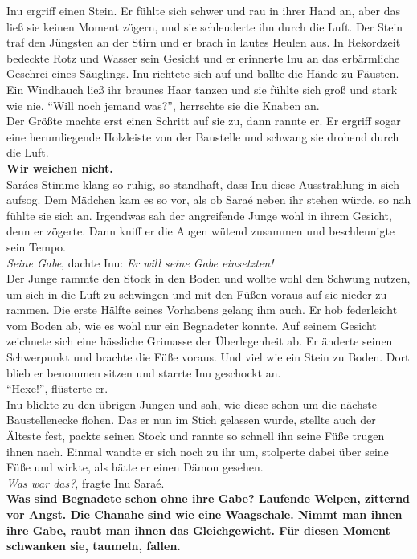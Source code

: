 \documentclass[a4paper,12pt]{book}
\begin{document}
Inu ergriff einen Stein. Er fühlte sich schwer und rau in ihrer Hand an, aber das ließ sie keinen 
Moment zögern, und sie schleuderte ihn durch die Luft. Der Stein traf den Jüngsten an der Stirn und 
er brach in lautes Heulen aus. In Rekordzeit bedeckte Rotz und Wasser sein Gesicht und er erinnerte 
Inu an das erbärmliche Geschrei eines Säuglings. Inu richtete sich auf und ballte die Hände zu 
Fäusten. Ein Windhauch ließ ihr braunes Haar tanzen und sie fühlte sich groß und stark wie nie.
``Will noch jemand was?'', herrschte sie die Knaben an. \\
Der Größte machte erst einen Schritt auf sie zu, dann rannte er. Er ergriff sogar eine herumliegende 
Holzleiste von der Baustelle und schwang sie drohend durch die Luft.\\
\textbf{Wir weichen nicht.}\\
Saráes Stimme klang so ruhig, so standhaft, dass Inu diese Ausstrahlung in sich aufsog. Dem Mädchen 
kam es so vor, als ob Saraé neben ihr stehen würde, so nah fühlte sie sich an. Irgendwas sah der 
angreifende Junge wohl in ihrem Gesicht, denn er zögerte. Dann kniff er die Augen wütend zusammen 
und beschleunigte sein Tempo.\\
\textit{Seine Gabe}, dachte Inu: \textit{Er will seine Gabe einsetzten!}\\
Der Junge rammte den Stock in den Boden und wollte wohl den Schwung nutzen, um sich in die Luft zu 
schwingen und mit den Füßen voraus auf sie nieder zu rammen. Die erste Hälfte seines Vorhabens 
gelang ihm auch. Er hob federleicht vom Boden ab, wie es wohl nur ein Begnadeter konnte. Auf seinem 
Gesicht zeichnete sich eine hässliche Grimasse der Überlegenheit ab. Er änderte seinen Schwerpunkt 
und brachte die Füße voraus. Und viel wie ein Stein zu Boden. Dort blieb er benommen sitzen und 
starrte Inu geschockt an. \\
``Hexe!'', flüsterte er. \\
Inu blickte zu den übrigen Jungen und sah, wie diese schon um die nächste Baustellenecke flohen. 
Das er nun im Stich gelassen wurde, stellte auch der Älteste fest, packte seinen Stock und rannte 
so schnell ihn seine Füße trugen ihnen nach. Einmal wandte er sich noch zu ihr um, stolperte dabei 
über seine Füße und wirkte, als hätte er einen Dämon gesehen. \\
\textit{Was war das?}, fragte Inu Saraé.\\
\textbf{Was sind Begnadete schon ohne ihre Gabe? Laufende Welpen, zitternd vor Angst. Die Chanahe 
sind wie eine Waagschale. Nimmt man ihnen ihre Gabe, raubt man ihnen das Gleichgewicht. Für diesen 
Moment schwanken sie, taumeln, fallen.}\\
\end{document}
